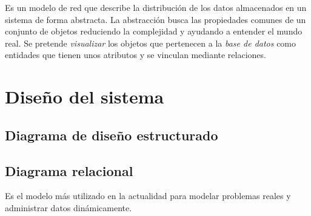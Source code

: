 \documentclass[12pt,a4paper,titlepage,spanish,twoside]{book}
\begin{document}
Es un modelo de red que describe la distribución de los datos almacenados en un 
sistema de forma abstracta. La abstracción busca las propiedades comunes de un 
conjunto de objetos reduciendo la complejidad y ayudando a entender el mundo 
real. Se pretende \emph{visualizar} los objetos que pertenecen a la
\emph{base de 
datos} como entidades que tienen unos atributos y se vinculan mediante 
relaciones.

\newpage
{}

\part{Diseño del sistema}
\chapter{Diagrama de diseño estructurado}

\begin{sidewaystable}
\end{sidewaystable}

\begin{sidewaystable}
\end{sidewaystable}

\begin{sidewaystable}
\end{sidewaystable}

\begin{sidewaystable}
\end{sidewaystable}

\begin{sidewaystable}
\end{sidewaystable}

\begin{sidewaystable}
\end{sidewaystable}

\chapter{Diagrama relacional}
Es el modelo más utilizado en la actualidad para modelar problemas reales y 
administrar datos dinámicamente.
\end{document}
